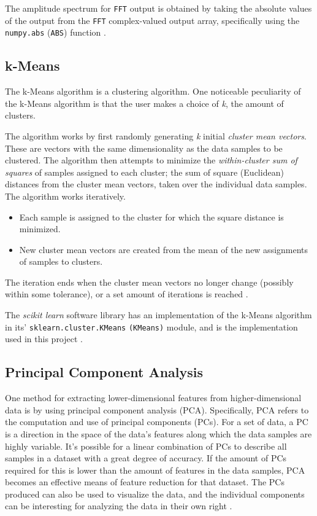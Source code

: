 \documentclass{article}
\begin{document}
The amplitude spectrum for \texttt{FFT} output is obtained by taking the absolute values of the output from the \texttt{FFT} complex-valued output array, specifically using the \texttt{numpy.abs} (\texttt{ABS}) function \citep{numpy}.

\subsection{k-Means}
The k-Means algorithm is a clustering algorithm. 
One noticeable peculiarity of the k-Means algorithm is that the user makes a choice of \textit{k}, the amount of clusters. 

The algorithm works by first randomly generating \textit{k} initial \textit{cluster mean vectors}. 
These are vectors with the same dimensionality as the data samples to be clustered. 
The algorithm then attempts to minimize the \textit{within-cluster sum of squares} of samples assigned to each cluster; the sum of square (Euclidean) distances from the cluster mean vectors, taken over the individual data samples.
The algorithm works iteratively. 
\begin{itemize}
    \item Each sample is assigned to the cluster for which the square distance is minimized.
    \item New cluster mean vectors are created from the mean of the new assignments of samples to clusters.
\end{itemize}
The iteration ends when the cluster mean vectors no longer change (possibly within some tolerance), or a set amount of iterations is reached \citep[p258-260]{PractStats}.

The \textit{scikit learn} software library has an implementation of the k-Means algorithm in its' \texttt{sklearn.cluster.KMeans} \texttt{(KMeans)} module, and is the implementation used in this project \citep{SKLEARN}.

\subsection{Principal Component Analysis}
One method for extracting lower-dimensional features from higher-dimensional data is by using principal component analysis (PCA).
Specifically, PCA refers to the computation and use of principal components (PCs).
For a set of data, a PC is a direction in the space of the data's features along which the data samples are highly variable.
It's possible for a linear combination of PCs to describe all samples in a dataset with a great degree of accuracy.
If the amount of PCs required for this is lower than the amount of features in the data samples, PCA becomes an effective means of feature reduction for that dataset.
The PCs produced can also be used to visualize the data, and the individual components can be interesting for analyzing the data in their own right \citep[p374-380]{ISLR}.
\end{document}
